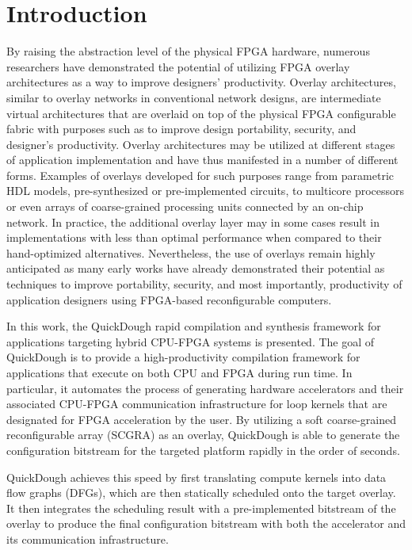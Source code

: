 \section{Introduction}\label{sec:introduction}

By raising the abstraction level of the physical FPGA hardware, numerous researchers have demonstrated the potential of utilizing FPGA overlay architectures as a way to improve designers' productivity\cite{Lebedev2010,kissler2006dynamically,unnikrishnan2009application,Yiannacouras2009FPS,Guy2012VENICE,Jeffrey2011potential}.
Overlay architectures, similar to overlay networks in conventional network designs, are intermediate virtual architectures that are overlaid on top of the physical FPGA configurable fabric with purposes such as to improve design portability, security, and designer's productivity.
Overlay architectures may be utilized at different stages of application implementation and have thus manifested in a number of different forms.
Examples of overlays developed for such purposes range from parametric HDL models, pre-synthesized or pre-implemented circuits, to multicore processors or even arrays of coarse-grained processing units connected by an on-chip network.
In practice, the additional overlay layer may in some cases result in implementations with less than optimal performance when compared to their hand-optimized alternatives.
Nevertheless, the use of overlays remain highly anticipated as many early works have already demonstrated their potential as techniques to improve portability, security, and most importantly, productivity of application designers using FPGA-based reconfigurable computers.

In this work, the QuickDough rapid compilation and synthesis framework for applications targeting hybrid CPU-FPGA systems is presented.  The goal of QuickDough is to provide a high-productivity compilation framework for applications that execute on both CPU and FPGA during run time.
In particular, it automates the process of generating hardware accelerators and their associated CPU-FPGA communication infrastructure for loop kernels that are designated for FPGA acceleration by the user.
By utilizing a soft coarse-grained reconfigurable array (SCGRA) as an overlay, QuickDough is able to generate the configuration bitstream for the targeted platform rapidly in the order of seconds.

QuickDough achieves this speed by first translating compute kernels into data flow graphs (DFGs), which are then statically scheduled onto the target overlay.
It then integrates the scheduling result with a pre-implemented bitstream of the overlay to produce the final configuration bitstream with both the accelerator and its communication infrastructure.

